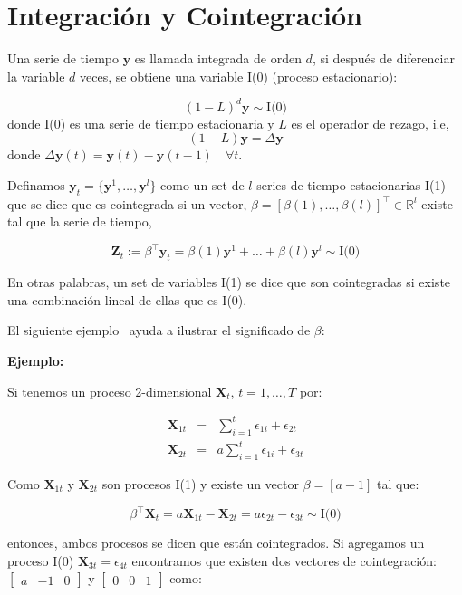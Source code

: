 \section{Integración y Cointegración}
Una serie de tiempo $\mathbf{y}$ es llamada integrada de orden $d$, si después
de diferenciar la variable $d$ veces, se obtiene una variable I(0) (proceso
estacionario):

\[
(1-L)^d \mathbf{y} \sim \text{I(0)}
\]
\noindent donde I(0) es una serie de tiempo estacionaria y $L$ es el operador de rezago, i.e,
\[
(1-L)\mathbf{y} = \Delta \mathbf{y}
\]
\noindent donde $\Delta \mathbf{y}(t) = \mathbf{y}(t)  -\mathbf{y}(t-1) \quad \forall t $.

Definamos $\mathbf{y}_t = \{\mathbf{y}^1, \dots, \mathbf{y}^l\}$ como un set de $l$ series de tiempo estacionarias 
I(1) que se dice que es cointegrada si un vector,
$\beta=[\beta(1),\dots,\beta(l)]^\intercal \in \mathbb{R}^l$  existe tal que la serie de tiempo, 

\begin{equation}
 \mathbf{Z}_t:= \beta^\intercal \mathbf{y}_t = \beta(1) \mathbf{y}^1 + \dots + \beta(l) \mathbf{y}^l \sim
  \text{I(0)}
  \end{equation}

En otras palabras, un set de variables I(1) se dice que son cointegradas si
existe una combinación lineal de ellas que es I(0).

El siguiente ejemplo~\cite{johansen1995} ayuda a ilustrar el significado de
$\beta$:

\textbf{Ejemplo:}

Si tenemos un proceso 2-dimensional $\mathbf{X}_t$, $t=1,\dots,T$ por:

\begin{eqnarray*}
\mathbf{X}_{1t} &=& \sum_{i=1}^t \epsilon_{1i} + \epsilon_{2t} \\
\mathbf{X}_{2t} &=& a \sum_{i=1}^t \epsilon_{1i} + \epsilon_{3t} 
\end{eqnarray*}

Como $\mathbf{X}_{1t}$ y $\mathbf{X}_{2t}$ son procesos I(1) y existe un vector
$\beta = [a -1]$ tal que:

\[
\beta^\intercal \mathbf{X}_t = a \mathbf{X}_{1t} -\mathbf{X}_{2t} = 
a\epsilon_{2t} - \epsilon_{3t} \sim \text{I(0)}
\]

entonces, ambos procesos se dicen que están cointegrados. Si agregamos un proceso I(0)
$\mathbf{X}_{3t} = \epsilon_{4t}$ encontramos que existen dos vectores de cointegración: 
$\begin{bmatrix}a &-1& 0\end{bmatrix}$ y $\begin{bmatrix}0
&0&1\end{bmatrix}$ como:

